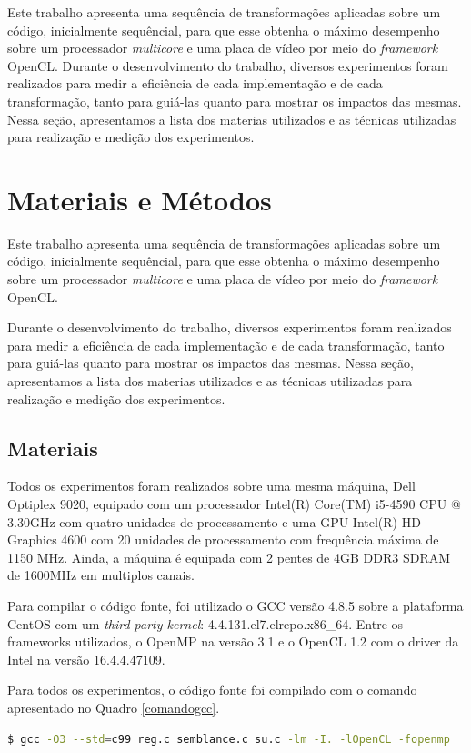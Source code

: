 \documentclass[12pt]{article}
\begin{document}
Este trabalho apresenta uma sequência de transformações aplicadas sobre um código, inicialmente sequêncial, para que esse obtenha o máximo desempenho sobre um processador \textit{multicore} e uma placa de vídeo por meio do \textit{framework} OpenCL. Durante o desenvolvimento do trabalho, diversos experimentos foram realizados para medir a eficiência de cada implementação e de cada transformação, tanto para guiá-las quanto para mostrar os impactos das mesmas. Nessa seção, apresentamos a lista dos materias utilizados e as técnicas utilizadas para realização e medição dos experimentos.
\section{Materiais e Métodos}

Este trabalho apresenta uma sequência de transformações aplicadas sobre um código, inicialmente sequêncial, para que esse obtenha o máximo desempenho sobre um processador \textit{multicore} e uma placa de vídeo por meio do \textit{framework} OpenCL.

Durante o desenvolvimento do trabalho, diversos experimentos foram realizados para medir a eficiência de cada implementação e de cada transformação, tanto para guiá-las quanto para mostrar os impactos das mesmas. Nessa seção, apresentamos a lista dos materias utilizados e as técnicas utilizadas para realização e medição dos experimentos.

\subsection{Materiais}

Todos os experimentos foram realizados sobre uma mesma máquina, Dell Optiplex 9020, equipado com um processador Intel(R) Core(TM) i5-4590 CPU @ 3.30GHz com quatro unidades de processamento e uma GPU Intel(R) HD Graphics 4600 com 20 unidades de processamento com frequência máxima de 1150 MHz. Ainda, a máquina é equipada com 2 pentes de 4GB DDR3 SDRAM de 1600MHz em multiplos canais.

Para compilar o código fonte, foi utilizado o GCC versão 4.8.5 sobre a plataforma CentOS com um \textit{third-party kernel}: 4.4.13\-1.el7.elrepo.x86\_64. Entre os frameworks utilizados, o OpenMP na versão 3.1 e o OpenCL 1.2 com o driver da Intel na versão 16.4.4.47109.

Para todos os experimentos, o código fonte foi compilado com o comando apresentado no Quadro \ref{comandogcc}.\\
\begin{lstlisting}[language=bash, caption=Comando para compilar o código fonte dos experimentos., label=comandogcc]
$ gcc -O3 --std=c99 reg.c semblance.c su.c -lm -I. -lOpenCL -fopenmp
\end{lstlisting}
\end{document}
